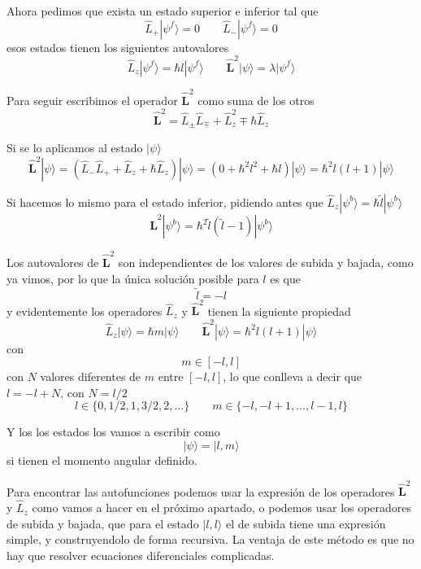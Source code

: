 Ahora pedimos que exista un estado superior e inferior tal que
\[ \hat{L}_+ |\psi^f\rangle = 0 \qquad \hat{L}_- |\psi^f\rangle = 0 \]
esos estados tienen los siguientes autovalores
\[ \hat{L}_z |\psi^f\rangle = \hbar l |\psi^f\rangle \qquad \hat{\boldsymbol{L}}^2 |\psi\rangle = \lambda |\psi^f\rangle \]

Para seguir escribimos el operador $\hat{\boldsymbol{L}}^2$ como suma de los otros
\begin{equation}
    \hat{\boldsymbol{L}}^2 = \hat{L}_\pm \hat{L}_\mp + \hat{L}^2_z \mp \hbar \hat{L}_z
\end{equation}

Si se lo aplicamos al estado $|\psi \rangle$ 
\[ \hat{\boldsymbol{L}}^2 |\psi\rangle = (\hat{L}_- \hat{L}_+ + \hat{L}_z + \hbar \hat{L}_z) |\psi\rangle = (0 + \hbar^2 l^2 + \hbar l)|\psi\rangle = \hbar^2 l(l + 1) |\psi\rangle \]

Si hacemos lo mismo para el estado inferior, pidiendo antes que $\hat{L}_z |\psi^b\rangle = \hbar \tilde{l} |\psi^b\rangle$
\[ \hat{\boldsymbol{L}}^2 |\psi^b\rangle = \hbar^2 \tilde{l} (\tilde{l} - 1) |\psi^b\rangle\]

Los autovalores de $\hat{\boldsymbol{L}}^2$ son independientes de los valores de subida y bajada, como ya vimos, por lo que la única solución posible para $l$ es que
\[ \tilde{l} = - l \]
y evidentemente los operadores $\hat{L}_z$ y $\hat{\boldsymbol{L}}^2$ tienen la siguiente propiedad
\begin{equation}
    \hat{L}_z |\psi\rangle = \hbar m |\psi\rangle \qquad \hat{\boldsymbol{L}}^2 |\psi\rangle = \hbar^2 l( l + 1) |\psi\rangle
\end{equation}
con
\begin{equation}
    m \in [-l, l]
\end{equation}
con $N$ valores diferentes de $m$ entre $[-l, l]$, lo que conlleva a decir que $l = -l + N$, con $N = l/2$
\begin{equation}
    l \in \{0, 1/2, 1, 3/2, 2, \dots\} \qquad m \in \{ -l, -l + 1, \dots, l - 1, l\}
\end{equation}

Y los los estados los vamos a escribir como
\begin{equation}
    |\psi\rangle = |l, m\rangle
\end{equation}
si tienen el momento angular definido.

Para encontrar las autofunciones podemos usar la expresión de los operadores $\hat{\boldsymbol{L}}^2$ y $\hat{L}_z$ como vamos a hacer en el próximo apartado, o podemos usar los operadores de subida y bajada, que para el estado $|l, l \rangle$ el de subida tiene una expresión simple, y construyendolo de forma recursiva.
La ventaja de este método es que no hay que resolver ecuaciones diferenciales complicadas.

